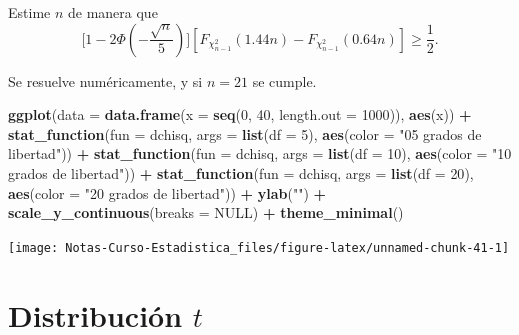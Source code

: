 \documentclass[
  12pt,
]{book}
\newenvironment{Shaded}{\begin{snugshade}}{\end{snugshade}}
\newcommand{\DataTypeTok}[1]{\textcolor[rgb]{0.13,0.29,0.53}{#1}}
\newcommand{\DecValTok}[1]{\textcolor[rgb]{0.00,0.00,0.81}{#1}}
\newcommand{\KeywordTok}[1]{\textcolor[rgb]{0.13,0.29,0.53}{\textbf{#1}}}
\newcommand{\NormalTok}[1]{#1}
\newcommand{\OperatorTok}[1]{\textcolor[rgb]{0.81,0.36,0.00}{\textbf{#1}}}
\newcommand{\OtherTok}[1]{\textcolor[rgb]{0.56,0.35,0.01}{#1}}
\newcommand{\StringTok}[1]{\textcolor[rgb]{0.31,0.60,0.02}{#1}}
\begin{document}
Estime \(n\) de manera que
\[\bigg[1-2\Phi\left(-\dfrac{\sqrt n}{5}\right)\bigg][F_{\chi^2_{n-1}}(1.44n)-F_{\chi^2_{n-1}}(0.64n)] \geq \dfrac 12.\]

Se resuelve numéricamente, y si \(n=21\) se cumple.

\begin{Shaded}
\begin{Highlighting}[]
\KeywordTok{ggplot}\NormalTok{(}\DataTypeTok{data =} \KeywordTok{data.frame}\NormalTok{(}\DataTypeTok{x =} \KeywordTok{seq}\NormalTok{(}\DecValTok{0}\NormalTok{, }\DecValTok{40}\NormalTok{, }\DataTypeTok{length.out =} \DecValTok{1000}\NormalTok{)), }\KeywordTok{aes}\NormalTok{(x)) }\OperatorTok{+}
\StringTok{  }\KeywordTok{stat\_function}\NormalTok{(}\DataTypeTok{fun =}\NormalTok{ dchisq, }\DataTypeTok{args =} \KeywordTok{list}\NormalTok{(}\DataTypeTok{df =} \DecValTok{5}\NormalTok{), }\KeywordTok{aes}\NormalTok{(}\DataTypeTok{color =} \StringTok{"05 grados de libertad"}\NormalTok{)) }\OperatorTok{+}
\StringTok{  }\KeywordTok{stat\_function}\NormalTok{(}\DataTypeTok{fun =}\NormalTok{ dchisq, }\DataTypeTok{args =} \KeywordTok{list}\NormalTok{(}\DataTypeTok{df =} \DecValTok{10}\NormalTok{), }\KeywordTok{aes}\NormalTok{(}\DataTypeTok{color =} \StringTok{"10 grados de libertad"}\NormalTok{)) }\OperatorTok{+}
\StringTok{  }\KeywordTok{stat\_function}\NormalTok{(}\DataTypeTok{fun =}\NormalTok{ dchisq, }\DataTypeTok{args =} \KeywordTok{list}\NormalTok{(}\DataTypeTok{df =} \DecValTok{20}\NormalTok{), }\KeywordTok{aes}\NormalTok{(}\DataTypeTok{color =} \StringTok{"20 grados de libertad"}\NormalTok{)) }\OperatorTok{+}
\StringTok{  }\KeywordTok{ylab}\NormalTok{(}\StringTok{""}\NormalTok{) }\OperatorTok{+}
\StringTok{  }\KeywordTok{scale\_y\_continuous}\NormalTok{(}\DataTypeTok{breaks =} \OtherTok{NULL}\NormalTok{) }\OperatorTok{+}
\StringTok{  }\KeywordTok{theme\_minimal}\NormalTok{()}
\end{Highlighting}
\end{Shaded}

\begin{center}\texttt{[image: Notas-Curso-Estadistica\_files/figure-latex/unnamed-chunk-41-1]} \end{center}

\hypertarget{distribuciuxf3n-t}{%
\section{\texorpdfstring{Distribución \(t\)}{Distribución t}}\label{distribuciuxf3n-t}}
\end{document}
